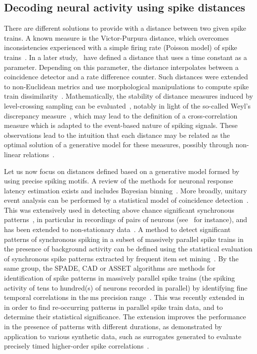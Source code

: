 \documentclass[brainsci, %
               review,submit,pdftex,moreauthors
               ]{Definitions/mdpi}
\newcommand{\ms}{\si{\milli\second}}%
\begin{document}
\subsection{Decoding neural activity using spike distances}\label{sec:detection}
There are different solutions to provide with a distance between two given spike trains. A known measure is the Victor-Purpura distance, which  overcomes inconsistencies experienced with a simple firing rate (Poisson model) of spike trains~\citep{victor_nature_1996}. In a later study,~\citet{van_rossum_novel_2001} have defined a distance that uses a time constant as a parameter. Depending on this parameter, the distance interpolates between a coincidence detector and a rate difference counter. Such distances were extended to non-Euclidean metrics and use morphological manipulations to compute spike train dissimilarity~\citep{kreuz_measuring_2007}. Mathematically, the stability of distance measures induced by level-crossing sampling can be evaluated~\citep{moser_stability_2014}, notably in light of the so-called Weyl's discrepancy measure~\citep{weyl_ueber_1916}, which may lead to the definition of a cross-correlation measure which is adapted to the event-based nature of spiking signals. These observations lead to the intuition that each distance may be related as the optimal solution of a generative model for these measures, possibly through non-linear relations~\citep{aronov_non-euclidean_2004}. %

Let us now focus on distances defined based on a generative model formed by using precise spiking motifs. A review of the methods for neuronal response latency estimation exists and includes Bayesian binning~\citep{levakova_review_2015}. More broadly, unitary event analysis can be performed by a statistical model of coincidence detection~\citep{grun_unitary_2002-1}. This was extensively used in detecting above chance significant synchronous patterns~\citep{grun_unitary_2010}, in particular in recordings of pairs of neurons (see~\citep{riehle_spike_1997} for instance), and has been extended to non-stationary data~\citep{grun_unitary_2002}. A method to detect significant patterns of synchronous spiking in a subset of massively parallel spike trains in the presence of background activity can be defined using the statistical evaluation of synchronous spike patterns extracted by frequent item set mining~\citep{torre_statistical_2013}. By the same group, the SPADE, CAD or ASSET algorithms are methods for identification of spike patterns in massively parallel spike trains (the spiking activity of tens to hundred(s) of neurons recorded in parallel) by identifying fine temporal correlations in the$~\ms$ precision range~\citep{quaglio_methods_2018}. This was recently extended in~\citep{stella_3d-spade_2019} in order to find re-occurring patterns in parallel spike train data, and to determine their statistical significance. The extension improves the performance in the presence of patterns with different durations, as demonstrated by application to various synthetic data, such as surrogates generated to evaluate precisely timed higher-order spike correlations~\citep{stella_comparing_2022}.
\end{document}

